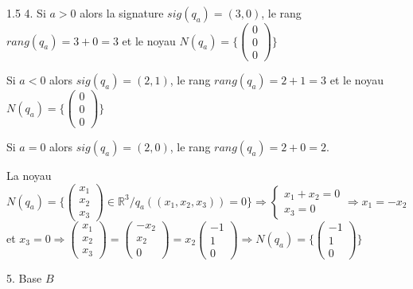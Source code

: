 \documentclass[12pt]{article}
\begin{document}
\begin{spacing}{1.5}
4. Si $a>0$ alors la signature $sig(q_a)=(3,0)$, le rang $rang(q_a)=3+0=3$ et le noyau $N(q_a)=\{\begin{pmatrix}
0 \\ 
0 \\ 
0
\end{pmatrix}\} $

Si $a<0$ alors $sig(q_a)=(2,1)$, le rang $rang(q_a)=2+1=3$ et le noyau $N(q_a)=\{\begin{pmatrix}
0 \\ 
0 \\ 
0
\end{pmatrix}\} $

Si $a=0$ alors $sig(q_a)=(2,0)$, le rang $rang(q_a)=2+0=2$.

La noyau $N(q_a)=\{\begin{pmatrix}
x_1 \\ 
x_2 \\ 
x_3
\end{pmatrix} \in \mathbb{R}^3/q_a((x_1,x_2,x_3))=0\} \Longrightarrow \begin{cases}
x_1+x_2=0\\
x_3=0
\end{cases}\Longrightarrow x_1=-x_2$ et $x_3=0
\Longrightarrow \begin{pmatrix}
x_1 \\ 
x_2 \\ 
x_3
\end{pmatrix}=\begin{pmatrix}
-x_2 \\ 
x_2 \\ 
0
\end{pmatrix}=x_2\begin{pmatrix}
-1\\ 
1 \\ 
0
\end{pmatrix}\Longrightarrow N(q_a)=\{\begin{pmatrix}
-1 \\ 
1 \\ 
0
\end{pmatrix}\}$

5. Base $B$


\end{spacing}
\end{document}
